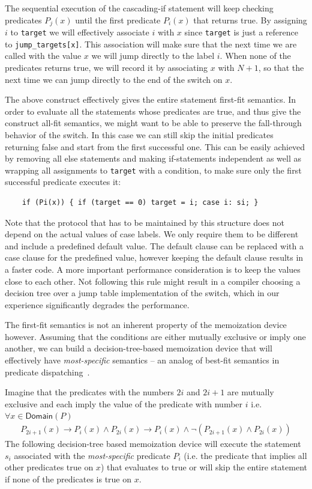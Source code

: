 \documentclass[preprint]{sigplanconf}
\makeatletter
\DeclareRobustCommand{\code}[1]{{\lstinline[breaklines=false,escapechar=@]{#1}}}
\makeatother
\begin{document}
The sequential execution of the cascading-if statement will keep checking 
predicates $P_j(x)$ until the first predicate $P_i(x)$ that returns true. By 
assigning $i$ to \code{target} we will effectively associate $i$ with $x$ since 
\code{target} is just a reference to \code{jump_targets[x]}. This association 
will make sure that the next time we are called with the value $x$ we will jump 
directly to the label $i$. When none of the predicates returns true, we will 
record it by associating $x$ with $N+1$, so that the next time we can jump 
directly to the end of the switch on $x$. 

The above construct effectively gives the entire statement first-fit semantics. 
In order to evaluate all the statements whose predicates are true, and thus 
give the construct all-fit semantics, we might want to be able to preserve the 
fall-through behavior of the switch. In this case we can still skip the initial 
predicates returning false and start from the first successful one. This can be 
easily achieved by removing all else statements and making if-statements 
independent as well as wrapping all assignments to \code{target} with a condition, 
to make sure only the first successful predicate executes it:

\begin{lstlisting}
    if (Pi(x)) { if (target == 0) target = i; case i: si; }
\end{lstlisting}

\noindent
Note that the protocol that has to be maintained by this structure does not 
depend on the actual values of case labels. We only require them to be 
different and include a predefined default value. The default clause can be 
replaced with a case clause for the predefined value, however keeping the default  
clause results in a faster code. A more important performance consideration is to 
keep the values close to each other. Not following this rule might result in a 
compiler choosing a decision tree over a jump table implementation of the 
switch, which in our experience significantly degrades the performance.

The first-fit semantics is not an inherent property of the memoization device however. 
Assuming that the conditions are either mutually exclusive or imply one another, we 
can build a decision-tree-based memoization device that will effectively have 
\emph{most-specific} semantics -- an analog of best-fit semantics in predicate 
dispatching~\cite{ErnstKC98}.

Imagine that the predicates with the numbers $2i$ and $2i+1$ are mutually exclusive and 
each imply the value of the predicate with number $i$ i.e. $\forall x \in \mathsf{Domain}(P)$
\begin{eqnarray*}
P_{2i+1}(x)\rightarrow P_i(x) \wedge P_{2i}(x)\rightarrow P_i(x) \wedge \neg(P_{2i+1}(x) \wedge P_{2i}(x))
\end{eqnarray*}
\noindent
The following decision-tree based memoization device will execute the statement 
$s_i$ associated with the \emph{most-specific} predicate $P_i$ (i.e. the 
predicate that implies all other predicates true on $x$) that evaluates to true or will 
skip the entire statement if none of the predicates is true on $x$.
\end{document}
